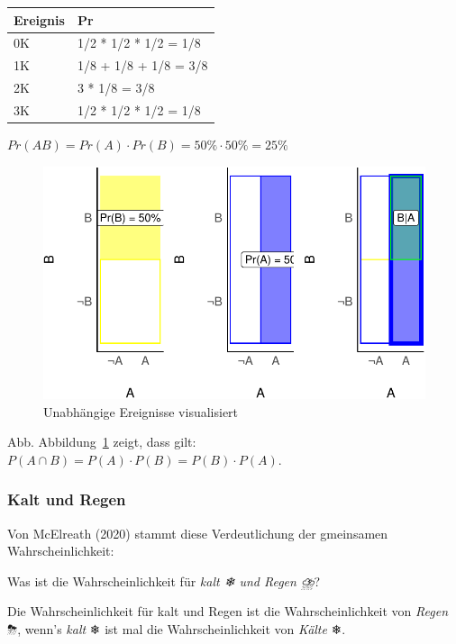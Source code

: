 \documentclass[
  a4paper,
  DIV=11]{scrreprt}
\theoremstyle{definition}
\theoremstyle{remark}
\begin{document}
\begin{longtable}[]{@{}ll@{}}
\toprule()
Ereignis & Pr \\
\midrule()
\endhead
0K & 1/2 * 1/2 * 1/2 = 1/8 \\
1K & 1/8 + 1/8 + 1/8 = 3/8 \\
2K & 3 * 1/8 = 3/8 \\
3K & 1/2 * 1/2 * 1/2 = 1/8 \\
\bottomrule()
\end{longtable}

\(Pr(AB) = Pr(A) \cdot Pr(B) = 50\% \cdot 50\% = 25\%\)

\begin{figure}

{\centering \includegraphics{./Wskt_files/figure-pdf/fig-unabh-e-1.pdf}

}

\caption{\label{fig-unabh-e}Unabhängige Ereignisse visualisiert}

\end{figure}

Abb. Abbildung~\ref{fig-unabh-e} zeigt, dass gilt:
\(P(A\cap B) = P(A) \cdot P(B) = P(B) \cdot P(A)\).

\hypertarget{kalt-und-regen}{%
\subsubsection{Kalt und Regen}\label{kalt-und-regen}}

Von McElreath (2020) stammt diese Verdeutlichung der gmeinsamen
Wahrscheinlichkeit:

Was ist die Wahrscheinlichkeit für \emph{kalt ❄ und Regen ⛈️}?

Die Wahrscheinlichkeit für kalt und Regen ist die Wahrscheinlichkeit von
\emph{Regen} ⛈, wenn's \emph{kalt} ❄ ist mal die Wahrscheinlichkeit von
\emph{Kälte} ❄.
\end{document}
